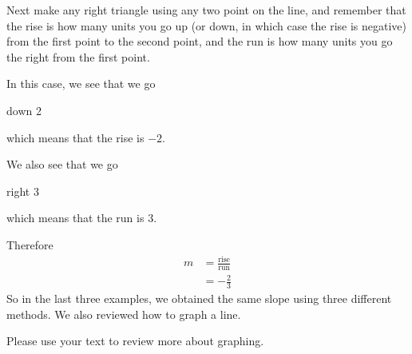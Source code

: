 \begin{myProof}
	Next make any right triangle using any two point on the line, and remember that the rise is
	how many units you go up (or down, in which case the rise is negative) from the first point
	to the second point, and the run is how many units you go the right from the first point.
																							
	In this case, we see that we go
	\begin{tightcenter}
		down 2
	\end{tightcenter}
	which means that the rise is $-2$. 
																										
	We also see that we go
	\begin{tightcenter}right 3\end{tightcenter}
	which means that the run is 3. 
																														
	Therefore
	\begin{align*}
		m & =		\frac{\mathrm{rise}}{\mathrm{run}} \\
		  & =		-\frac{2}{3}                       
	\end{align*}
	So in the last three examples, we obtained the same slope using three different methods. We also reviewed
	how to graph a line. 
																														
	Please use your text to review more about graphing.
\end{myProof}
																			
